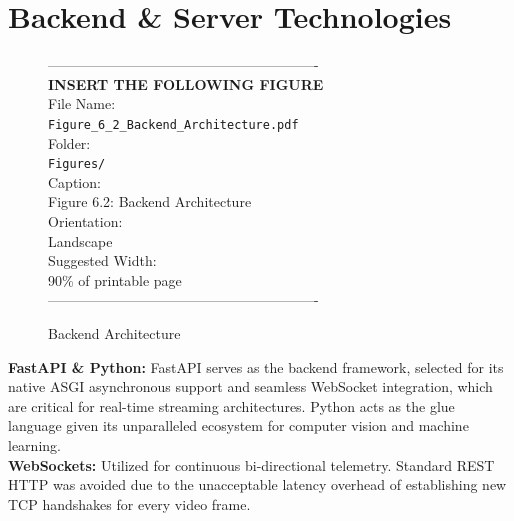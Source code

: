 \documentclass[12pt, a4paper]{report}
\begin{document}
\section{Backend \& Server Technologies}
\begin{figure}[htbp]
\begin{center}
----------------------------------------------------------\\
\vspace{0.5em}
\textbf{INSERT THE FOLLOWING FIGURE}\\
\vspace{1em}
File Name:\\
\texttt{Figure\_6\_2\_Backend\_Architecture.pdf}\\
\vspace{1em}
Folder:\\
\texttt{Figures/}\\
\vspace{1em}
Caption:\\
Figure 6.2: Backend Architecture\\
\vspace{1em}
Orientation:\\
Landscape\\
\vspace{1em}
Suggested Width:\\
90\% of printable page\\
\vspace{3cm}
----------------------------------------------------------
\end{center}
\caption{Backend Architecture}
\label{fig:diag_2}
\end{figure}
\textbf{FastAPI \& Python:} FastAPI serves as the backend framework, selected for its native ASGI asynchronous support and seamless WebSocket integration, which are critical for real-time streaming architectures. Python acts as the glue language given its unparalleled ecosystem for computer vision and machine learning.
\\
\textbf{WebSockets:} Utilized for continuous bi-directional telemetry. Standard REST HTTP was avoided due to the unacceptable latency overhead of establishing new TCP handshakes for every video frame.
\end{document}
